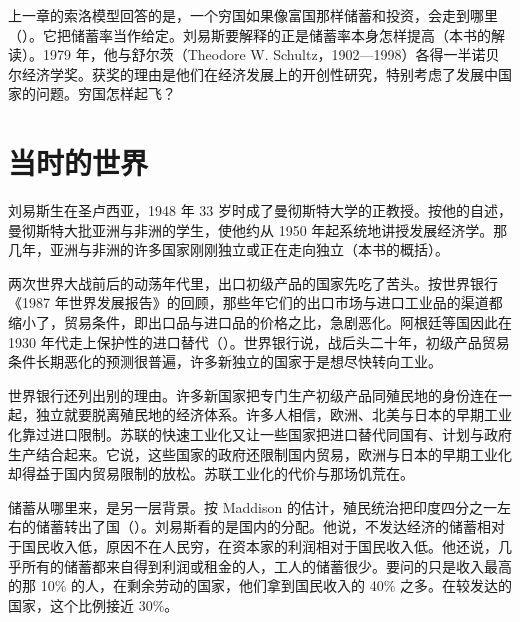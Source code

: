 上一章的索洛模型回答的是，一个穷国如果像富国那样储蓄和投资，会走到哪里（）。它把储蓄率当作给定。刘易斯要解释的正是储蓄率本身怎样提高（本书的解读）。1979 年，他与舒尔茨（Theodore W. Schultz，1902—1998）各得一半诺贝尔经济学奖\cite{nobel1979,loc41,gnd41}。获奖的理由是他们在经济发展上的开创性研究，特别考虑了发展中国家的问题\cite{nobel1979}。穷国怎样起飞？

\section{当时的世界}\label{sec:development-world}

刘易斯生在圣卢西亚，1948 年 33 岁时成了曼彻斯特大学的正教授\cite{lewisbio1979}。按他的自述，曼彻斯特大批亚洲与非洲的学生，使他约从 1950 年起系统地讲授发展经济学\cite{lewisbio1979}。那几年，亚洲与非洲的许多国家刚刚独立或正在走向独立（本书的概括）。

两次世界大战前后的动荡年代里，出口初级产品的国家先吃了苦头。按世界银行《1987 年世界发展报告》的回顾，那些年它们的出口市场与进口工业品的渠道都缩小了，贸易条件，即出口品与进口品的价格之比，急剧恶化\cite{wdr1987}。阿根廷等国因此在 1930 年代走上保护性的进口替代（）\cite{wdr1987}。世界银行说，战后头二十年，初级产品贸易条件长期恶化的预测很普遍，许多新独立的国家于是想尽快转向工业\cite{wdr1987}。

世界银行还列出别的理由\cite{wdr1987}。许多新国家把专门生产初级产品同殖民地的身份连在一起，独立就要脱离殖民地的经济体系。许多人相信，欧洲、北美与日本的早期工业化靠过进口限制。苏联的快速工业化又让一些国家把进口替代同国有、计划与政府生产结合起来\cite{wdr1987}。它说，这些国家的政府还限制国内贸易，欧洲与日本的早期工业化却得益于国内贸易限制的放松\cite{wdr1987}。苏联工业化的代价与那场饥荒在。

储蓄从哪里来，是另一层背景。按 Maddison 的估计，殖民统治把印度四分之一左右的储蓄转出了国（）\cite{maddison1971}。刘易斯看的是国内的分配。他说，不发达经济的储蓄相对于国民收入低，原因不在人民穷，在资本家的利润相对于国民收入低\cite{lewis1954}。他还说，几乎所有的储蓄都来自得到利润或租金的人，工人的储蓄很少\cite{lewis1954}。要问的只是收入最高的那 10\% 的人，在剩余劳动的国家，他们拿到国民收入的 40\% 之多\cite{lewis1954}。在较发达的国家，这个比例接近 30\%。

